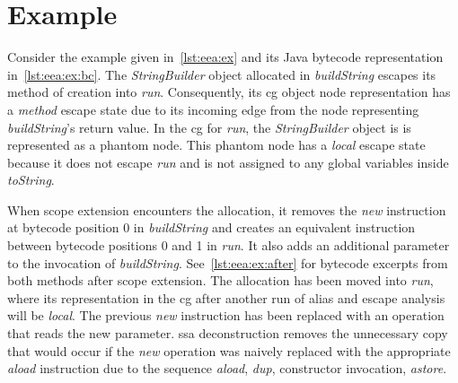 
	\section{Example}
		\label{sec:eea:ex}
		Consider the example given in~\cref{lst:eea:ex} and its Java bytecode representation in~\cref{lst:eea:ex:bc}. The
		\emph{StringBuilder} object allocated in \emph{buildString} escapes its method of creation into \emph{run}.
		Consequently, its \gls{cg} object node representation has a \emph{method} escape state due to its incoming edge from
		the node representing \emph{buildString}'s return value. In the \acrlong{cg} for \emph{run}, the
		\emph{StringBuilder} object is is represented as a phantom node. This phantom node has a \emph{local} escape state
		because it does not escape \emph{run} and is not assigned to any global variables inside \emph{toString}.


		When scope extension encounters the allocation, it removes the \emph{new} instruction at bytecode position 0 in
		\emph{buildString} and creates an equivalent instruction between bytecode positions 0 and
		1 in \emph{run}. It also adds an additional parameter to the invocation of \emph{buildString}.
		See~\cref{lst:eea:ex:after} for bytecode excerpts from both methods after scope extension. The allocation has been
		moved into \emph{run}, where its representation in the \gls{cg} after another run of alias and escape analysis will
		be \emph{local}. The previous \emph{new} instruction has been replaced with an operation that reads the new
		parameter. \Gls{ssa} deconstruction removes the unnecessary copy that would occur if the \emph{new} operation was
		naively replaced with the appropriate \emph{aload} instruction due to the sequence \emph{aload}, \emph{dup},
		constructor invocation, \emph{astore}.

